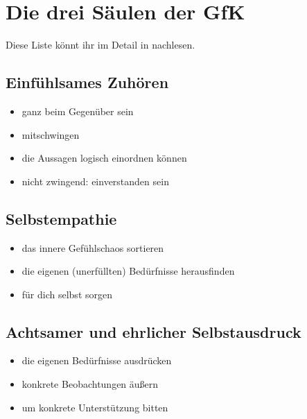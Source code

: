 \section{Die drei Säulen der GfK}
\label{gfk-saeulen}

Diese Liste könnt ihr im Detail in \cite[S.~33~f]{gfk-dummies} nachlesen.


\subsection{Einfühlsames Zuhören}

\begin{itemize}
 \item ganz beim Gegenüber sein
 \item mitschwingen
 \item die Aussagen logisch einordnen können
 \item nicht zwingend: einverstanden sein
\end{itemize}


\subsection{Selbstempathie}

\begin{itemize}
 \item das innere Gefühlschaos sortieren
 \item die eigenen (unerfüllten) Bedürfnisse herausfinden
 \item für dich selbst sorgen
\end{itemize}


\subsection{Achtsamer und ehrlicher Selbstausdruck}

\begin{itemize}
 \item die eigenen Bedürfnisse ausdrücken
 \item konkrete Beobachtungen äußern
 \item um konkrete Unterstützung bitten
\end{itemize}
